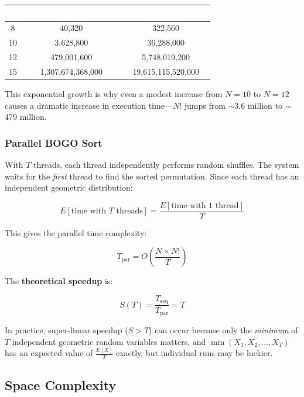 \documentclass[11pt]{article}
\begin{document}
\begin{center}
\begin{tabular}{|c|c|c|}
\hline
\rowcolor{tableheader}
\textcolor{white}{$N$} & \textcolor{white}{$N!$ (Expected Shuffles)} & \textcolor{white}{$N \times N!$ (Operations)} \\ \hline
8 & 40,320 & 322,560 \\ \hline
10 & 3,628,800 & 36,288,000 \\ \hline
12 & 479,001,600 & 5,748,019,200 \\ \hline
15 & 1,307,674,368,000 & 19,615,115,520,000 \\ \hline
\end{tabular}
\end{center}

This exponential growth is why even a modest increase from $N = 10$ to $N = 12$ causes a dramatic increase in execution time---$N!$ jumps from $\sim$3.6 million to $\sim$479 million.

\subsubsection{Parallel BOGO Sort}

With $T$ threads, each thread independently performs random shuffles. The system waits for the \textit{first} thread to find the sorted permutation. Since each thread has an independent geometric distribution:

$$E[\text{time with } T \text{ threads}] = \frac{E[\text{time with 1 thread}]}{T}$$

This gives the parallel time complexity:

$$\boxed{T_{\text{par}} = O\left(\frac{N \times N!}{T}\right)}$$

The \textbf{theoretical speedup} is:

$$S(T) = \frac{T_{\text{seq}}}{T_{\text{par}}} = T$$

In practice, super-linear speedup ($S > T$) can occur because only the \textit{minimum} of $T$ independent geometric random variables matters, and $\min(X_1, X_2, \ldots, X_T)$ has an expected value of $\frac{E[X]}{T}$ exactly, but individual runs may be luckier.

\subsection{Space Complexity}
\end{document}
